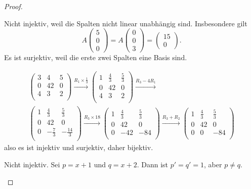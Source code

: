 \begin{proof}
	\begin{parts}
	\item Nicht injektiv, weil die Spalten nicht linear unabhängig sind. Insbesondere gilt
		\[
		A\begin{pmatrix} 5 \\ 0 \\ 0 \end{pmatrix} =A\begin{pmatrix} 0 \\ 0 \\ 3 \end{pmatrix} =\begin{pmatrix} 15 \\ 0 \end{pmatrix} 
		.\] 
		Es ist surjektiv, weil die erste zwei Spalten eine Basis sind.
	\item
		\begin{gather*}
		\left(
\begin{array}{ccc}
 3 & 4 & 5 \\
 0 & 42 & 0 \\
 4 & 3 & 2 \\
\end{array}
\right) \xrightarrow{R_1\times \frac{1}{3}} \left(
\begin{array}{ccc}
 1 & \frac{4}{3} & \frac{5}{3} \\
 0 & 42 & 0 \\
 4 & 3 & 2 \\
\end{array}
\right) \xrightarrow{R_3-4R_1} \\\left(
\begin{array}{ccc}
 1 & \frac{4}{3} & \frac{5}{3} \\
 0 & 42 & 0 \\
 0 & -\frac{7}{3} & -\frac{14}{3} \\
\end{array}
\right) \xrightarrow{R_3\times 18} \left(
\begin{array}{ccc}
 1 & \frac{4}{3} & \frac{5}{3} \\
 0 & 42 & 0 \\
 0 & -42 & -84 \\
\end{array}
\right) \xrightarrow{R_3+R_2} \left(
\begin{array}{ccc}
 1 & \frac{4}{3} & \frac{5}{3} \\
 0 & 42 & 0 \\
 0 & 0 & -84 \\
\end{array}
\right)	
		\end{gather*}
		also es ist injektiv und surjektiv, daher bijektiv.
	\item Nicht injektiv. Sei $p=x+1$ und $q=x+2$. Dann ist $p'=q'=1$, aber $p\neq q$. 


\end{parts}
\end{proof}
